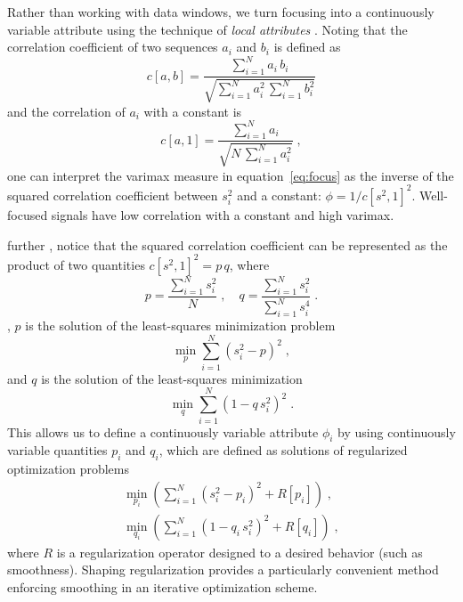 Rather than working with data windows, we turn focusing into a
continuously variable attribute using the technique of
\emph{local attributes} \cite[]{attr}. Noting that the correlation
coefficient of two sequences $a_i$ and $b_i$ is defined as
\begin{equation}
  c[a,b] = {\frac{\displaystyle \sum_{i=1}^N a_i\,b_i}{\displaystyle \sqrt{\sum_{i=1}^N a_i^2\,\sum_{i=1}^N b_i^2}}}
  \label{eq:c}
\end{equation}
and the correlation of $a_i$ with a constant is
\begin{equation}
  c[a,1] = {\frac{\displaystyle \sum_{i=1}^N a_i}{\displaystyle \sqrt{N\,\sum_{i=1}^N a_i^2}}}\;,
  \label{eq:c2}
\end{equation}
one can interpret the varimax measure in equation~\ref{eq:focus} as
the inverse of the squared correlation coefficient between $s_i^2$ and
a constant: $\phi = 1/c[s^2,1]^2$. Well-focused signals  have low correlation with a constant and
 high varimax.

  further , notice that the squared correlation coefficient can
be represented as the product of two quantities $c[s^2,1]^2 = p\,q$,
where 
\begin{equation}
\label{eq:pq}
p=\frac{\displaystyle \sum_{i=1}^N s_i^2}{\displaystyle N}\;,\quad q=\frac{\displaystyle \sum_{i=1}^N s_i^2}{\displaystyle \sum_{i=1}^N s_i^4}\;.
\end{equation}
, $p$ is the solution of the least-squares
minimization problem
\begin{equation}
  \label{eq:p}
  \min_p \sum_{i=1}^N \left(s_i^2 - p\right)^2\;,
\end{equation}
and $q$ is the
solution of the least-squares minimization
\begin{equation}
  \label{eq:q}
  \min_q \sum_{i=1}^N \left(1 - q\,s_i^2\right)^2\;.
\end{equation}
This allows us to define a continuously variable attribute $\phi_i$ by
using continuously variable quantities $p_i$ and $q_i$, which are
defined as solutions of regularized optimization problems
\begin{eqnarray}
  \label{eq:pt}
  \min_{p_i} 
  \left(\sum_{i=1}^N \left(s_i^2 - p_i\right)^2 + R\left[p_i\right]\right)\;, \\
   \label{eq:qt}
   \min_{q_i}
   \left(\sum_{i=1}^N \left(1 - q_i\,s_i^2\right)^2 + R\left[q_i\right]\right)\;,
\end{eqnarray}
where $R$ is a regularization operator designed to   a desired behavior (such as
smoothness). Shaping regularization \cite[]{shape} provides a
particularly convenient method   enforcing smoothing
in an iterative optimization scheme.

